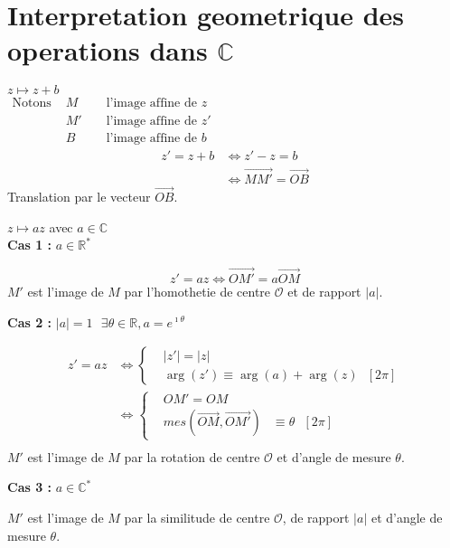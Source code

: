 \documentclass[12pt,twoside,a4paper]{article}
\begin{document}
	\section{Interpretation geometrique des operations dans $\mathbb{C}$}
		\begin{liste}
			\item $z\longmapsto z+b$\\
				$\begin{aligned}\text{Notons }&M&&\text{ l'image affine de }z \\
											   &M'&&\text{ l'image affine de }z' \\
											   &B&&\text{ l'image affine de }b\end{aligned}$
				$$\begin{aligned}
					z'=z+b&\iff z'-z=b \\
						  &\iff\vec{MM'}=\vec{OB}
				\end{aligned}$$
				Translation par le vecteur $\vec{OB}$.
			\item $z\longmapsto az$ avec $a\in\mathbb{C}$\\
				\textbf{Cas 1 :} $a\in\mathbb{R}^*$
				\begin{tab}
					$$
						z'=az\iff\vec{OM'}=a\vec{OM}
					$$
					$M'$ est l'image de $M$ par l'homothetie de centre $\mathcal{O}$ et de rapport $\left|a\right|$.
				\end{tab}
				\textbf{Cas 2 :} $\left|a\right|=1\ \ \ \exists\theta\in\mathbb{R},a=e^{\imath\theta}$
				\begin{tab}
					$$\begin{aligned}
						z'=az&\iff\left\{\begin{aligned}&\left|z'\right|=\left|z\right| \\
														 &\arg\left(z'\right)\equiv\arg\left(a\right)+\arg\left(z\right)\ \ \ \left[2\pi\right]\end{aligned}\right. \\
							 &\iff\left\{\begin{aligned}&OM'=OM \\
														 &mes\left(\vec{OM}, \vec{OM'}\right)&\equiv\theta\ \ \ \left[2\pi\right]\end{aligned}\right. \\
					\end{aligned}$$
					$M'$ est l'image de $M$ par la rotation de centre $\mathcal{O}$ et d'angle de mesure $\theta$.
				\end{tab}
				\textbf{Cas 3 :} $a\in\mathbb{C}^*$
				\begin{tab}
					$M'$ est l'image de $M$ par la similitude de centre $\mathcal{O}$, de rapport $\left|a\right|$ et d'angle de mesure $\theta$.
				\end{tab}
		\end{liste}
\end{document}
